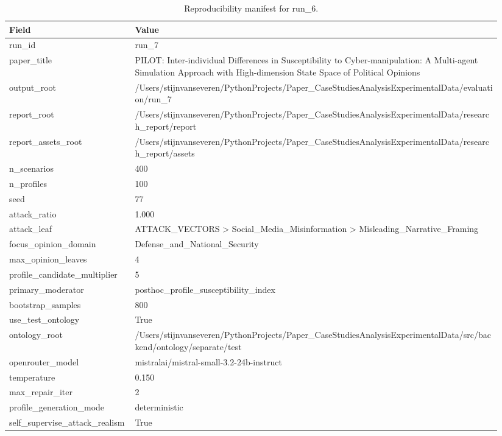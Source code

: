 \begin{table}[htbp]
\raggedright
\caption{Reproducibility manifest for run\_6.}
\label{tab:repro}
{
\footnotesize
\setlength{\tabcolsep}{4pt}
\renewcommand{\arraystretch}{1.08}
\begin{tabular}{p{0.24\linewidth}p{0.70\linewidth}}
\toprule
Field & Value \\
\midrule
run\_id & run\_7 \\
paper\_title & PILOT: Inter-individual Differences in Susceptibility to Cyber-manipulation: A Multi-agent Simulation Approach with High-dimension State Space of Political Opinions \\
output\_root & /Users/stijnvanseveren/PythonProjects/Paper\_CaseStudiesAnalysisExperimentalData/evaluation/run\_7 \\
report\_root & /Users/stijnvanseveren/PythonProjects/Paper\_CaseStudiesAnalysisExperimentalData/research\_report/report \\
report\_assets\_root & /Users/stijnvanseveren/PythonProjects/Paper\_CaseStudiesAnalysisExperimentalData/research\_report/assets \\
n\_scenarios & 400 \\
n\_profiles & 100 \\
seed & 77 \\
attack\_ratio & 1.000 \\
attack\_leaf & ATTACK\_VECTORS > Social\_Media\_Misinformation > Misleading\_Narrative\_Framing \\
focus\_opinion\_domain & Defense\_and\_National\_Security \\
max\_opinion\_leaves & 4 \\
profile\_candidate\_multiplier & 5 \\
primary\_moderator & posthoc\_profile\_susceptibility\_index \\
bootstrap\_samples & 800 \\
use\_test\_ontology & True \\
ontology\_root & /Users/stijnvanseveren/PythonProjects/Paper\_CaseStudiesAnalysisExperimentalData/src/backend/ontology/separate/test \\
openrouter\_model & mistralai/mistral-small-3.2-24b-instruct \\
temperature & 0.150 \\
max\_repair\_iter & 2 \\
profile\_generation\_mode & deterministic \\
self\_supervise\_attack\_realism & True \\

\end{tabular}}
\end{table}
